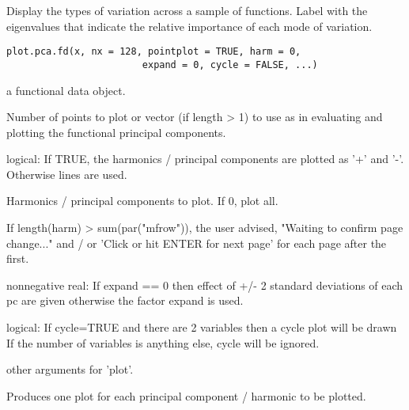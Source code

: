 \documentclass{article}
\begin{document}
\begin{Description}\relax
Display the types of variation across a sample of functions.  Label
with the eigenvalues that indicate the relative importance of each
mode of variation.
\end{Description}
\begin{Usage}
\begin{verbatim}
plot.pca.fd(x, nx = 128, pointplot = TRUE, harm = 0,
                        expand = 0, cycle = FALSE, ...)
\end{verbatim}
\end{Usage}
\begin{Arguments}
\begin{ldescription}
\item[\code{x}] a functional data object.

\item[\code{nx}] Number of points to plot or vector (if length > 1) to use as
 in evaluating and plotting the functional principal
components. 

\item[\code{pointplot}] logical:  If TRUE, the harmonics / principal components are plotted
as '+' and '-'.   Otherwise lines are used.

\item[\code{harm}] Harmonics / principal components to plot.  If 0, plot all.

If length(harm) > sum(par("mfrow")), the user advised, "Waiting to
confirm page change..." and / or 'Click or hit ENTER for next page'
for each page after the first.  

\item[\code{expand}] nonnegative real:  If expand == 0 then effect of +/- 2 standard
deviations of each pc are given otherwise the factor expand is
used.  

\item[\code{cycle}] logical:  If cycle=TRUE and there are 2 variables then a cycle plot
will be drawn If the number of variables is anything else, cycle
will be ignored. 

\item[\code{...}] other arguments for 'plot'.  

\end{ldescription}
\end{Arguments}
\begin{Details}\relax
Produces one plot for each principal component / harmonic to be
plotted.
\end{Details}
\end{document}
